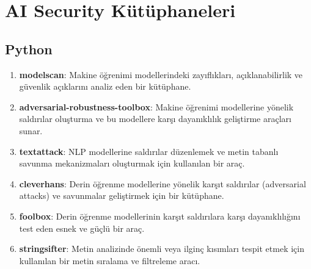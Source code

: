 \section{AI Security Kütüphaneleri}

\subsection{Python}
\begin{enumerate}
    \item \textbf{modelscan}: Makine öğrenimi modellerindeki zayıflıkları, açıklanabilirlik ve güvenlik açıklarını analiz eden bir kütüphane.
    \item \textbf{adversarial-robustness-toolbox}: Makine öğrenimi modellerine yönelik saldırılar oluşturma ve bu modellere karşı dayanıklılık geliştirme araçları sunar.
    \item \textbf{textattack}: NLP modellerine saldırılar düzenlemek ve metin tabanlı savunma mekanizmaları oluşturmak için kullanılan bir araç.
    \item \textbf{cleverhans}: Derin öğrenme modellerine yönelik karşıt saldırılar (adversarial attacks) ve savunmalar geliştirmek için bir kütüphane.
    \item \textbf{foolbox}: Derin öğrenme modellerinin karşıt saldırılara karşı dayanıklılığını test eden esnek ve güçlü bir araç.
    \item \textbf{stringsifter}: Metin analizinde önemli veya ilginç kısımları tespit etmek için kullanılan bir metin sıralama ve filtreleme aracı.
\end{enumerate}

\newpage